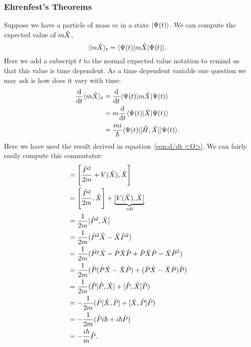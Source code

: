     \subsubsection{Ehrenfest's Theorems}
    Suppose we have a particle of mass \(m\) in a state \(\vert {\Psi(t)} \rangle\).
    We can compute the expected value of \(m\hat{X}\),
    \[\langle{m\hat{X}}\rangle_t = \langle {\Psi(t)} \vert m \hat{X} \vert {\Psi(t)} \rangle.\]
    Here we add a subscript \(t\) to the normal expected value notation to remind us that this value is time dependent.
    As a time dependent variable one question we may ask is how does it vary with time:
    \begin{align*}
        \dv{t} \langle{m\hat{X}}\rangle_t &= \dv{t}\langle {\Psi(t)} \vert m\hat{X}\vert {\Psi(t)} \rangle\\
        &= m\dv{t}\langle {\Psi(t)} \vert\hat{X}\vert {\Psi(t)} \rangle\\
        &= \frac{mi}{\hbar} \langle {\Psi(t)} \vert[\hat{H}, \hat{X}]\vert {\Psi(t)} \rangle.
    \end{align*}
    Here we have used the result derived in equation~\ref{eqn:d/dt <O>}.
    We can fairly easily compute this commutator:
    \begin{align*}
        [\operator{H}, \operator{X}] &= \left[\frac{\operator{P}^2}{2m} + V(\operator{X}), \operator{X}\right]\\
        &= \left[\frac{\operator{P}^2}{2m}, \operator{X}\right] + \underbrace{[V(\operator{X}), \operator{X}]}_{=0}\\
        &= \frac{1}{2m}[\operator{P}^2, \operator{X}]\\
        &= \frac{1}{2m}(\operator{P}^2\operator{X} - \operator{X}\operator{P}^2)\\
        &= \frac{1}{2m}(\operator{P^2}\operator{X} - \operator{P}\operator{X}\operator{P} + \operator{P}\operator{X}\operator{P} - \operator{X}\operator{P}^2)\\
        &= \frac{1}{2m}(\operator{P}(\operator{P}\operator{X} - \operator{X}\operator{P}) + (\operator{P}\operator{X} - \operator{X}\operator{P})\operator{P})\\
        &= \frac{1}{2m}(\operator{P}[\operator{P}, \operator{X}] + [\operator{P}, \operator{X}]\operator{P})\\
        &= -\frac{1}{2m}(\operator{P}[\operator{X}, \operator{P}] + [\operator{X}, \operator{P}]\operator{P})\\
        &= -\frac{1}{2m}(\operator{P}i\hbar + i\hbar\operator{P})\\
        &= -\frac{i\hbar}{m}\operator{P}.
    \end{align*}
